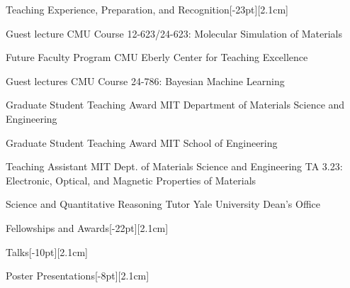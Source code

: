 \documentclass{cv} %
\begin{document}
\begin{cvSection}{Teaching Experience, Preparation, and Recognition}[-23pt][2.1cm]

    {Guest lecture}
    {CMU Course 12-623/24-623: Molecular Simulation of Materials}
    {}

    \cvItem{}
    {Future Faculty Program}
    {CMU Eberly Center for Teaching Excellence}
    {}

    \cvItem{}
    {Guest lectures}
    {CMU Course 24-786: Bayesian Machine Learning}
    {}
  
    {Graduate Student Teaching Award}
    {MIT Department of Materials Science and Engineering}
    {}

    \cvItem{}
    {Graduate Student Teaching Award}
    {MIT School of Engineering}
    {}
  
    {Teaching Assistant}
    {MIT Dept. of Materials Science and Engineering}
    {\vspace{14pt}TA 3.23: Electronic, Optical, and Magnetic Properties of Materials}

    {Science and Quantitative Reasoning Tutor}
    {Yale University Dean's Office}
    {}

\end{cvSection}

\begin{cvSection}{Fellowships and Awards}[-22pt][2.1cm]
    
\end{cvSection}

\begin{pubsSection}[-7pt][2.1cm]
  
\end{pubsSection}

\begin{cvSection}{Talks}[-10pt][2.1cm]
    
\end{cvSection}

\begin{cvSection}{Poster Presentations}[-8pt][2.1cm]
    
\end{cvSection}
\end{document}
